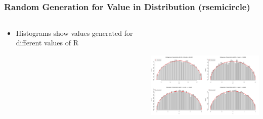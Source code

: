 \documentclass[handout, xcolor=dvipsnames]{beamer}
\begin{document}
\subsection{}
\begin{frame}
	\frametitle{Random Generation for Value in Distribution (rsemicircle)}
            \begin{columns}[T]
                \begin{column}{.3\textwidth}
            	\begin{itemize}
                	\item Histograms show values generated for different values of R
                    \end{itemize}
                \end{column}
                \begin{column}{.7\textwidth}
                    \includegraphics[width=8cm,height=6cm]{Figures/rsemicircle-histograms.png}
                \end{column}
            \end{columns}
\end{frame}
\end{document}
